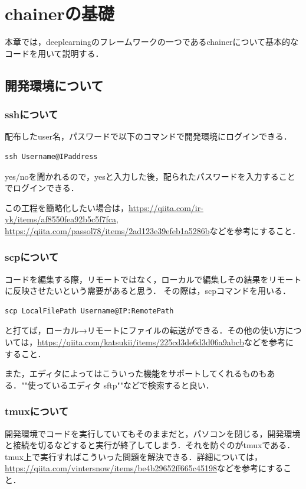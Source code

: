 
\section{chainerの基礎}
本章では，deeplearningのフレームワークの一つであるchainerについて基本的なコードを用いて説明する．
\subsection{開発環境について}
\subsubsection{sshについて}
配布したuser名，パスワードで以下のコマンドで開発環境にログインできる．

\begin{lstlisting}[basicstyle=\ttfamily\footnotesize, frame=single]
ssh Username@IPaddress
\end{lstlisting}
yes/noを聞かれるので，yesと入力した後，配られたパスワードを入力することでログインできる．

この工程を簡略化したい場合は，\url{https://qiita.com/ir-yk/items/af8550fea92b5c5f7fca},
\url{https://qiita.com/passol78/items/2ad123e39efeb1a5286b}などを参考にすること．
\subsubsection{scpについて}
コードを編集する際，リモートではなく，ローカルで編集しその結果をリモートに反映させたいという需要があると思う．
その際は，scpコマンドを用いる．
\begin{lstlisting}[basicstyle=\ttfamily\footnotesize, frame=single]
scp LocalFilePath Username@IP:RemotePath
\end{lstlisting}
と打てば，ローカル→リモートにファイルの転送ができる．その他の使い方については，\url{https://qiita.com/katsukii/items/225cd3de6d3d06a9abcb}などを参考にすること．

また，エディタによってはこういった機能をサポートしてくれるものもある．""使っているエディタ sftp""などで検索すると良い．

\subsubsection{tmuxについて}
開発環境でコードを実行していてもそのままだと，パソコンを閉じる，開発環境と接続を切るなどすると実行が終了してしまう．それを防ぐのがtmuxである．tmux上で実行すればこういった問題を解決できる．詳細については，
\url{https://qiita.com/vintersnow/items/be4b29652ff665c45198}などを参考にすること．
